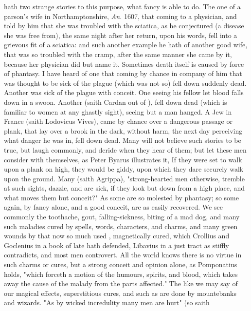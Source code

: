 hath two strange stories to this purpose, what fancy is able to do. The one of
a parson's wife in Northamptonshire, \emph{An.} 1607, that coming to a
physician, and told by him that she was troubled with the sciatica, as he
conjectured (a disease she was free from), the same night after her return,
upon his words, fell into a grievous fit of a sciatica: and such another
example he hath of another good wife, that was so troubled with the cramp,
after the same manner she came by it, because her physician did but name it.
Sometimes death itself is caused by force of phantasy. I have heard of one that
coming by chance in company of him that was thought to be sick of the plague
(which was not so) fell down suddenly dead. Another was sick of the plague with
conceit. One seeing his fellow let blood falls down in a swoon. Another (saith
Cardan out of \Aristotle{}), fell down dead (which is
familiar to women at any ghastly sight), seeing but a man hanged. A Jew in
France (saith Lodovicus Vives), came by chance over a
dangerous passage or plank, that lay over a brook in the dark, without harm,
the next day perceiving what danger he was in, fell down dead. Many will not
believe such stories to be true, but laugh commonly, and deride when they hear
of them; but let these men consider with themselves, as
Peter Byarus illustrates it, If they were set to walk upon
a plank on high, they would be giddy, upon which they dare securely walk upon
the ground. Many (saith Agrippa), "strong-hearted men
otherwise, tremble at such sights, dazzle, and are sick, if they look but down
from a high place, and what moves them but conceit?" As some are so molested by
phantasy; so some again, by fancy alone, and a good conceit, are as easily
recovered. We see commonly the toothache, gout, falling-sickness, biting of a
mad dog, and many such maladies cured by spells, words, characters, and charms,
and many green wounds by that now so much used ,
magnetically cured, which Crollius and Goclenius in a book of late hath
defended, Libavius in a just tract as stiffly contradicts, and most men
controvert. All the world knows there is no virtue in such charms or cures, but
a strong conceit and opinion alone, as Pomponatius holds,
"which forceth a motion of the humours, spirits, and blood, which takes away
the cause of the malady from the parts affected." The like we may say of our
magical effects, superstitious cures, and such as are done by mountebanks and
wizards. "As by wicked incredulity many men are hurt" (so saith
